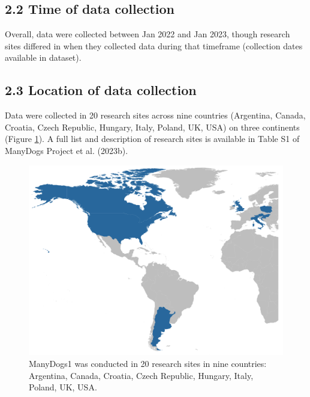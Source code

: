 \documentclass[
  pub,floatsintext]{apa6}
\begin{document}
\hypertarget{time-of-data-collection}{%
\subsection{2.2 Time of data collection}\label{time-of-data-collection}}

Overall, data were collected between Jan 2022 and Jan 2023, though research sites differed in when they collected data during that timeframe (collection dates available in dataset).

\hypertarget{location-of-data-collection}{%
\subsection{2.3 Location of data collection}\label{location-of-data-collection}}

Data were collected in 20 research sites across nine countries (Argentina, Canada, Croatia, Czech Republic, Hungary, Italy, Poland, UK, USA) on three continents (Figure \ref{fig:countries}). A full list and description of research sites is available in Table S1 of ManyDogs Project et al. (2023b).

\begin{figure}

{\centering \includegraphics[width=1\linewidth]{md1_countries} 

}

\caption{ManyDogs1 was conducted in 20 research sites in nine countries: Argentina, Canada, Croatia, Czech Republic, Hungary, Italy, Poland, UK, USA.}\label{fig:countries}
\end{figure}
\end{document}
